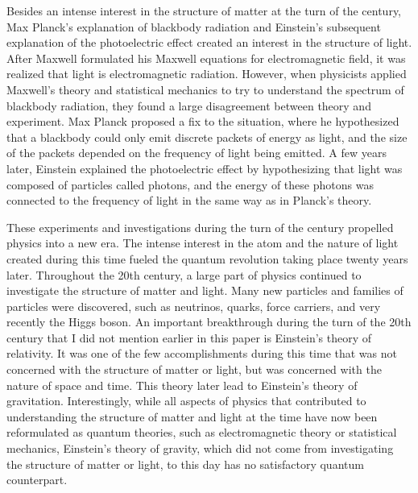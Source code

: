 \documentclass[12pt, oneside, letterpaper, fleqn]{article}
\begin{document}
Besides an intense interest in the structure of matter at the turn of
the century, Max Planck's explanation of blackbody radiation and
Einstein's subsequent explanation of the photoelectric effect created an
interest in the structure of light. After Maxwell formulated his Maxwell
equations for electromagnetic field, it was realized that light is
electromagnetic radiation. However, when physicists applied Maxwell's
theory and statistical mechanics to try to understand the spectrum of
blackbody radiation, they found a large disagreement between theory and
experiment. Max Planck proposed a fix to the situation, where he
hypothesized that a blackbody could only emit discrete packets of energy
as light, and the size of the packets depended on the frequency of light
being emitted. A few years later, Einstein explained the photoelectric
effect by hypothesizing that light was composed of particles called
photons, and the energy of these photons was connected to the frequency
of light in the same way as in Planck's theory.

These experiments and investigations during the turn of the century
propelled physics into a new era. The intense interest in the atom and
the nature of light created during this time fueled the quantum
revolution taking place twenty years later. Throughout the 20th century,
a large part of physics continued to investigate the structure of matter
and light. Many new particles and families of particles were discovered,
such as neutrinos, quarks, force carriers, and very recently the Higgs
boson. An important breakthrough during the turn of the 20th century
that I did not mention earlier in this paper is Einstein's theory of
relativity. It was one of the few accomplishments during this time that
was not concerned with the structure of matter or light, but was
concerned with the nature of space and time. This theory later lead to
Einstein's theory of gravitation. Interestingly, while all aspects
of physics that contributed to understanding the structure of matter and
light at the time have now been reformulated as quantum theories, such
as electromagnetic theory or statistical mechanics, Einstein's theory of
gravity, which did not come from investigating the structure of matter
or light, to this day has no satisfactory quantum counterpart.

\nocite{*}
%


\end{document}

